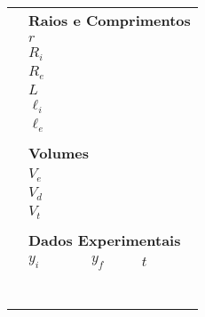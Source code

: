 \begin{table*}[!ht]
    \centering
    \begin{tabular}{lp{25mm}p{25mm}p{25mm}l}
    \toprule
        &\multicolumn{4}{l}{\textbf{Raios e Comprimentos}} \\
        \cmidrule{2-3}
        & $r$ \cellcolor[gray]{0.89} & \cellcolor[gray]{0.92} \\
        & $R_i$ \cellcolor[gray]{0.95} & \cellcolor[gray]{0.97} \\
        & $R_e$ \cellcolor[gray]{0.89} & \cellcolor[gray]{0.92} \\
        & $L$ \cellcolor[gray]{0.95} & \cellcolor[gray]{0.97} \\
        & $\ell_i$ \cellcolor[gray]{0.89} & \cellcolor[gray]{0.92} \\
        & $\ell_e$ \cellcolor[gray]{0.95} & \cellcolor[gray]{0.97} \\
        \cmidrule{2-3}
        \\
        &\multicolumn{4}{l}{\textbf{Volumes}} \\
        \cmidrule{2-3}
        & $V_e$ \cellcolor[gray]{0.89} & \cellcolor[gray]{0.92} \\
        & $V_d$ \cellcolor[gray]{0.95} & \cellcolor[gray]{0.97} \\
        & $V_t$ \cellcolor[gray]{0.89} & \cellcolor[gray]{0.92} \\
        \cmidrule{2-3}
        \\
        &\multicolumn{4}{l}{\textbf{Dados Experimentais}} \\
        \cmidrule{2-4}
        & $y_i$ & $y_f$ & $t$ & \\
        \cmidrule{2-4}
        & \cellcolor[gray]{0.89} & \cellcolor[gray]{0.92} & \cellcolor[gray]{0.89} \\
        & \cellcolor[gray]{0.95} & \cellcolor[gray]{0.97} & \cellcolor[gray]{0.95} \\
        & \cellcolor[gray]{0.89} & \cellcolor[gray]{0.92} & \cellcolor[gray]{0.89} \\
        & \cellcolor[gray]{0.95} & \cellcolor[gray]{0.97} & \cellcolor[gray]{0.95} \\
        & \cellcolor[gray]{0.89} & \cellcolor[gray]{0.92} & \cellcolor[gray]{0.89} \\
        & \cellcolor[gray]{0.95} & \cellcolor[gray]{0.97} & \cellcolor[gray]{0.95} \\
        & \cellcolor[gray]{0.89} & \cellcolor[gray]{0.92} & \cellcolor[gray]{0.89} \\

\end{tabular}
\end{table*}
